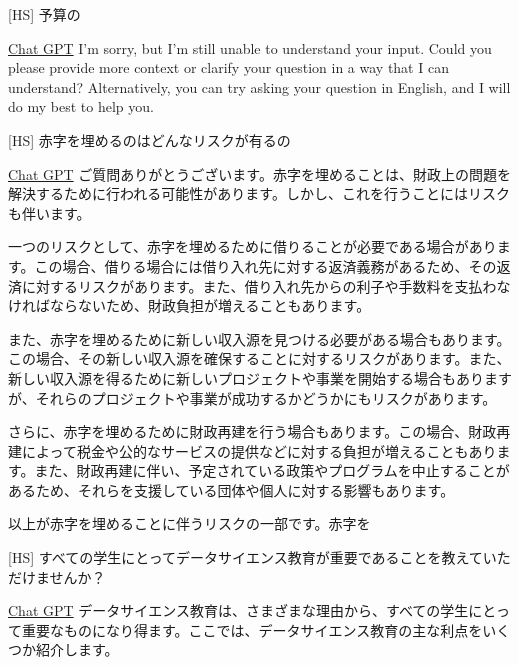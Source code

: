 \documentclass[
]{book}
\theoremstyle{definition}
\theoremstyle{definition}
\theoremstyle{definition}
\theoremstyle{definition}
\theoremstyle{remark}
\begin{document}
{[}HS{]} 予算の

\protect\hyperlink{chatgpt}{Chat GPT} I'm sorry, but I'm still unable to understand your input. Could you please provide more context or clarify your question in a way that I can understand? Alternatively, you can try asking your question in English, and I will do my best to help you.

{[}HS{]} 赤字を埋めるのはどんなリスクが有るの

\protect\hyperlink{chatgpt}{Chat GPT} ご質問ありがとうございます。赤字を埋めることは、財政上の問題を解決するために行われる可能性があります。しかし、これを行うことにはリスクも伴います。

一つのリスクとして、赤字を埋めるために借りることが必要である場合があります。この場合、借りる場合には借り入れ先に対する返済義務があるため、その返済に対するリスクがあります。また、借り入れ先からの利子や手数料を支払わなければならないため、財政負担が増えることもあります。

また、赤字を埋めるために新しい収入源を見つける必要がある場合もあります。この場合、その新しい収入源を確保することに対するリスクがあります。また、新しい収入源を得るために新しいプロジェクトや事業を開始する場合もありますが、それらのプロジェクトや事業が成功するかどうかにもリスクがあります。

さらに、赤字を埋めるために財政再建を行う場合もあります。この場合、財政再建によって税金や公的なサービスの提供などに対する負担が増えることもあります。また、財政再建に伴い、予定されている政策やプログラムを中止することがあるため、それらを支援している団体や個人に対する影響もあります。

以上が赤字を埋めることに伴うリスクの一部です。赤字を

{[}HS{]} すべての学生にとってデータサイエンス教育が重要であることを教えていただけませんか？

\protect\hyperlink{chatgpt}{Chat GPT} データサイエンス教育は、さまざまな理由から、すべての学生にとって重要なものになり得ます。ここでは、データサイエンス教育の主な利点をいくつか紹介します。
\end{document}
